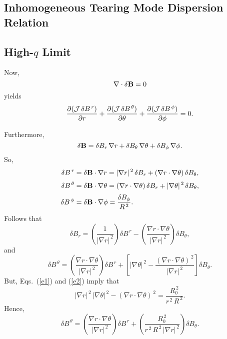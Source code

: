 \documentclass[12pt]{article}
\begin{document}
\subsection{Inhomogeneous Tearing Mode Dispersion Relation}
\subsection{High-$q$ Limit}
Now,
\begin{equation}
\nabla \cdot \delta{\bf B}=0
\end{equation}
yields
\begin{equation}\label{e38}
\frac{\partial ({\cal J}\,\delta B^{\,r})}{\partial r}+ \frac{\partial({\cal J}\,\delta B^{\,\theta})}{\partial\theta} +\frac{\partial({\cal J}\,\delta B^{\,\phi})}{\partial\phi} =0.
\end{equation}

Furthermore,
\begin{equation}
\delta {\bf B} = \delta B_r\,\nabla r + \delta B_\theta\,\nabla\theta
+\delta B_\phi\,\nabla\phi.
\end{equation}
So,
\begin{align}
\delta B^{\,r} &=\delta {\bf B}\cdot \nabla r = |\nabla r|^{\,2}\,\delta  B_r+
(\nabla r\cdot\nabla\theta)\,\delta B_\theta,\\[0.5ex]
\delta B^{\,\theta} &= \delta {\bf B}\cdot\nabla\theta = (\nabla r\cdot\nabla\theta)\,\delta B_r
+|\nabla \theta|^{\,2}\,\delta B_\theta,\\[0.5ex]
\delta B^{\,\phi}&=\delta {\bf B}\cdot\nabla\phi = \frac{\delta B_\phi}{R^{\,2}}.
\end{align}
Follows that
\begin{equation}\label{e43}
\delta B_r = \left(\frac{1}{|\nabla r|^{\,2}}\right)\delta B^{\,r}-\left(
\frac{\nabla r\cdot\nabla\theta}{|\nabla r|^{\,2}}\right)\delta B_\theta,
\end{equation}
and
\begin{equation}\label{e44}
\delta B^{\,\theta}=\left(\frac{\nabla r\cdot\nabla\theta}{|\nabla r|^{\,2}}\right)
\delta B^{\,r}+ \left[|\nabla\theta|^{\,2}-\frac{(\nabla r\cdot\nabla\theta)^{\,2}}{|\nabla r|^{\,2}}\right]\delta B_\theta.
\end{equation}
But, Eqs.~(\ref{e1}) and (\ref{e2}) imply that
\begin{equation}
|\nabla r|^{\,2}\,|\nabla\theta|^{\,2}-(\nabla r\cdot\nabla\theta)^{\,2} = \frac{R_0^{\,2}}{r^{\,2}\,R^{\,2}}.
\end{equation}
Hence,
\begin{equation}\label{e46}
\delta B^{\,\theta} = \left(\frac{\nabla r\cdot\nabla\theta}{|\nabla r|^{\,2}}\right)
\delta B^{\,r}+ \left(\frac{R_0^{\,2}}{r^{\,2}\,R^{\,2}\,|\nabla r|^{\,2}}\right)\delta B_\theta.
\end{equation}
\end{document}
